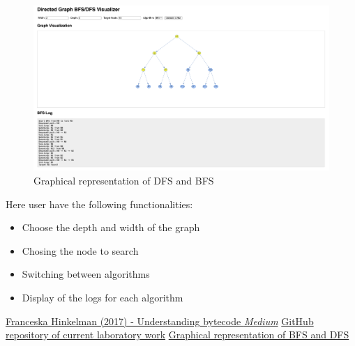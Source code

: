 \documentclass[12pt]{article}
\begin{document}
\begin{figure}[h]
    \centering
    \includegraphics[width=1\textwidth]{images/site.png}
    \caption{Graphical representation of DFS and BFS}
    \label{fig:site}
\end{figure}

Here user have the following functionalities:
\begin{itemize}
  \item Choose the depth and width of the graph
  \item Chosing the node to search
  \item Switching between algorithms
  \item Display of the logs for each algorithm
\end{itemize}

\clearpage
\begin{thebibliography}{9}

   \href{https://medium.com/dailyjs/understanding-v8s-bytecode-317d46c94775}{Franceska
      Hinkelman (2017) - Understanding bytecode \emph{Medium}}
   \href{https://github.com/DdimaPos/AA-labs/tree/main/Lab3}{GitHub repository of current laboratory work}
   \href{https://dfs-bfs-visualization.vercel.app/}{Graphical representation of BFS and DFS}
\end{thebibliography}
\end{document}

